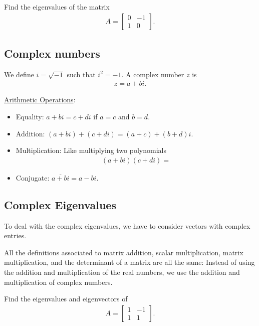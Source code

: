 \documentclass[12pt,a4paper]{article}
\newcounter{example}[section]
\begin{document}
		\begin{example}
		Find the eigenvalues of the matrix
			\begin{align*}
			A = \begin{bmatrix}
			0 & -1 \\ 1 & 0
			\end{bmatrix}.
			\end{align*}
		\end{example}
		
		\vfill
	
		\subsection{Complex numbers}
		We define $i = \sqrt{-1}$ such that $i^2 = -1$. A complex number $z$ is
			\begin{align*}
			z = a + b i .
			\end{align*}
			
		\underline{Arithmetic Operations}:
			\begin{itemize}
			\item Equality: $a + bi = c + di$ if $a = c$ and $b = d$.
			\item Addition: $(a + bi) + (c + di) = (a + c) + (b + d) i$.
			\item Multiplication: Like multiplying two polynomials
				\begin{align*}
				(a + bi) (c + di) = 
				\end{align*}
			\item Conjugate: $\overline{a + bi} = a - bi$.
			\end{itemize}
		
		\newpage
		
		
		\subsection{Complex Eigenvalues}
		To deal with the complex eigenvalues, we have to consider vectors with complex entries. 
		
		All the definitions associated to matrix addition, scalar multiplication, matrix multiplication, and the determinant of a matrix are all the same: Instead of using the addition and multiplication of the real numbers, we use the addition and multiplication of complex numbers.
		
		\vspace*{14pt}
		
		\begin{example}
		Find the eigenvalues and eigenvectors of
			\begin{align*}
			A = \begin{bmatrix}
			1 & -1 \\ 1 & 1
			\end{bmatrix} .
			\end{align*}
		\end{example}
		
\end{document}

